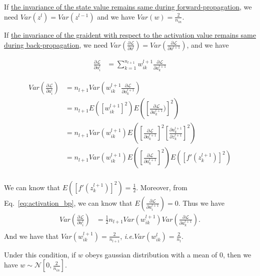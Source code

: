 \documentclass[10pt,onecolumn]{book}
\def\ie{\emph{i.e.}}
\begin{document}
If \uline{the invariance of the state value remains same during forward-propagation}, we need $Var(z^l) = Var(z^{l - 1})$ and we have $Var(w)  = \frac{2}{n_{in}}$.

If \uline{the invariance of the graident with respect to the activation value remains same during back-propagation}, we need $Var(\frac{\partial{\mathcal{L}}}{\partial a^{l}}) = Var(\frac{\partial{\mathcal{L}}}{\partial a^{l + 1}})$, and we have

\begin{equation} \label{eq:activation_bp}
\begin{split}
 \frac{\partial{\mathcal{L}}}{\partial a^l_i} &= \sum_{k=1}^{n_{l+1}} w^{l+1}_{ik} \frac{\partial \mathcal{L}}{\partial a^{l+1}_k}
\end{split} 
\end{equation}

\begin{equation}
\begin{split}
	Var(\frac{\partial{\mathcal{L}}}{\partial a^l_i}) &= n_{l+1} Var(w^{l+1}_{ik} \frac{\partial  \mathcal{L}}{\partial  a^{l+1}_k}) \\
	&= n_{l+1} E([w^{l+1}_{ik}]^2) E([\frac{\partial  \mathcal{L}}{\partial  a^{l+1}_k})]^2) \\
	&= n_{l+1} Var(w^{l+1}_{ik}) E([\frac{\partial  \mathcal{L}}{\partial  a^{l+1}_k}]^2 [\frac{\partial a^{l+1}_k}{\partial  z^{l+1}_k}]^2) \\
	&= n_{l+1} Var(w^{l+1}_{ik}) E([\frac{\partial  \mathcal{L}}{\partial  a^{l+1}_k}]^2) E([f'(z^{l+1}_k)]^2) \\
\end{split} 
\end{equation}

We can know that $E([f'(z^{l+1}_k)]^2) = \frac{1}{2}$. Moreover, from Eq.~\ref{eq:activation_bp}, we can know that $E(\frac{\partial \mathcal{L}}{\partial a^{l+1}_i}) = 0$. Thus we have
\begin{equation}
\begin{split}
	Var(\frac{\partial{\mathcal{L}}}{\partial a^l_i}) &= \frac{1}{2} n_{l+1} Var(w^{l+1}_{ik}) Var(\frac{\partial  \mathcal{L}}{\partial  a^{l+1}_k}). \\
\end{split} 
\end{equation}
And we have that $Var(w^{l+1}_{ik}) = \frac{2}{n_{l+1}}$, \ie $Var(w^{l}_{ik}) = \frac{2}{n_{l}}$.

Under this condition, if $w$ obeys gaussian distribution with a mean of 0, then we have $w \sim \mathcal{N}[0, \frac{2}{n_{in}}]$.
\end{document}
